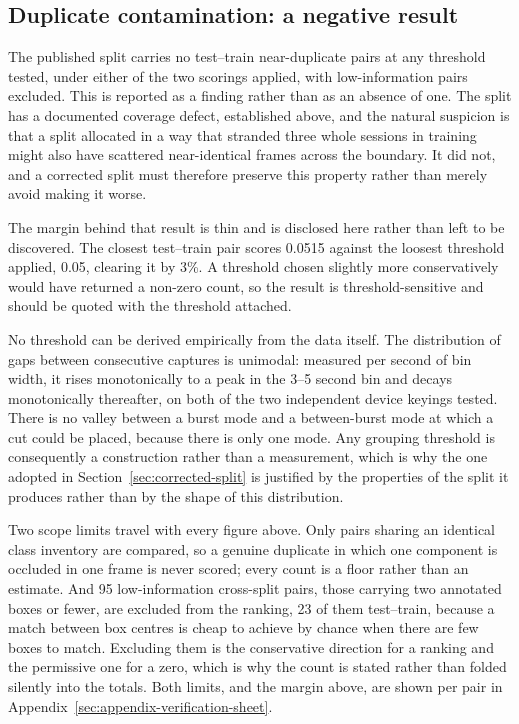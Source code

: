 \subsection{Duplicate contamination: a negative result}
\label{sec:duplicate-contamination}

The published split carries no test--train near-duplicate pairs at any threshold
tested, under either of the two scorings applied, with low-information pairs
excluded. This is reported as a finding rather than as an absence of one. The
split has a documented coverage defect, established above, and the natural
suspicion is that a split allocated in a way that stranded three whole sessions
in training might also have scattered near-identical frames across the boundary.
It did not, and a corrected split must therefore preserve this property rather
than merely avoid making it worse.

The margin behind that result is thin and is disclosed here rather than left to
be discovered. The closest test--train pair scores 0.0515 against the loosest
threshold applied, 0.05, clearing it by 3\%. A threshold chosen slightly more
conservatively would have returned a non-zero count, so the result is
threshold-sensitive and should be quoted with the threshold attached.

No threshold can be derived empirically from the data itself. The distribution of
gaps between consecutive captures is unimodal: measured per second of bin width,
it rises monotonically to a peak in the 3--5 second bin and decays monotonically
thereafter, on both of the two independent device keyings tested. There is no
valley between a burst mode and a between-burst mode at which a cut could be
placed, because there is only one mode. Any grouping threshold is consequently a
construction rather than a measurement, which is why the one adopted in
Section~\ref{sec:corrected-split} is justified by the properties of the split it
produces rather than by the shape of this distribution.

Two scope limits travel with every figure above. Only pairs sharing an identical
class inventory are compared, so a genuine duplicate in which one component is
occluded in one frame is never scored; every count is a floor rather than an
estimate. And 95 low-information cross-split pairs, those carrying two annotated
boxes or fewer, are excluded from the ranking, 23 of them test--train, because a
match between box centres is cheap to achieve by chance when there are few boxes
to match. Excluding them is the conservative direction for a ranking and the
permissive one for a zero, which is why the count is stated rather than folded
silently into the totals. Both limits, and the margin above, are shown per pair
in Appendix~\ref{sec:appendix-verification-sheet}.
